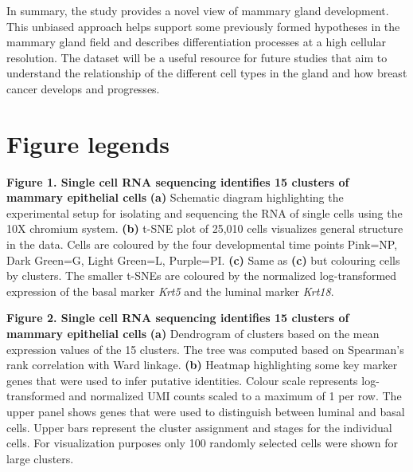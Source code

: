 \documentclass[titlepage, 12pt, oneside]{amsart}
\newcommand{\fakefigure}[1]%
{\refstepcounter{figure}\label{#1}}
\begin{document}
In summary, the study provides a novel view of mammary gland development.
This unbiased approach helps support some previously formed hypotheses in the mammary gland field and describes differentiation processes at a high cellular resolution.
The dataset will be a useful resource for future studies that aim to understand the relationship of the different cell types in the gland and how breast cancer develops and progresses.

\section{Figure legends}

\textbf{Figure 1. Single cell RNA sequencing identifies 15 clusters of mammary epithelial cells }
\fakefigure{F1}
\textbf{(a)} Schematic diagram highlighting the experimental setup for isolating and sequencing the RNA of single cells using the 10X chromium system.
\textbf{(b)} t-SNE plot of 25,010 cells visualizes general structure in the data.
Cells are coloured by the four developmental time points Pink=NP, Dark Green=G, Light Green=L, Purple=PI.
\textbf{(c)} Same as \textbf{(c)} but colouring cells by clusters. The smaller t-SNEs are coloured by the normalized log-transformed expression of the basal marker \textit{Krt5} and the luminal marker \textit{Krt18}.


\textbf{Figure 2. Single cell RNA sequencing identifies 15 clusters of mammary epithelial cells }
\fakefigure{F2}
\textbf{(a)} Dendrogram of clusters based on the mean expression values of the 15 clusters. The tree was computed based on Spearman's rank correlation with Ward linkage.
\textbf{(b)} Heatmap highlighting some key marker genes that were used to infer putative identities.
Colour scale represents log-transformed and normalized UMI counts scaled to a maximum of 1 per row.
The upper panel shows genes that were used to distinguish between luminal and basal cells.
Upper bars represent the cluster assignment and stages for the individual cells.
For visualization purposes only 100 randomly selected cells were shown for large clusters.
\end{document}
